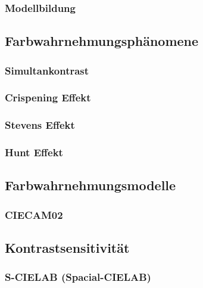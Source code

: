 \documentclass[a4paper, 11pt, accentcolor = tud3b]{tudreport}
\begin{document}
				\subsubsection{Modellbildung} %

			\subsection{Farbwahrnehmungsphänomene} %

				\subsubsection{Simultankontrast} %

				\subsubsection{Crispening Effekt} %

				\subsubsection{Stevens Effekt} %

				\subsubsection{Hunt Effekt} %

			\subsection{Farbwahrnehmungsmodelle} %

				\subsubsection{CIECAM02} %

			\subsection{Kontrastsensitivität} %

				\subsubsection{S-CIELAB (Spacial-CIELAB)} %
\end{document}
